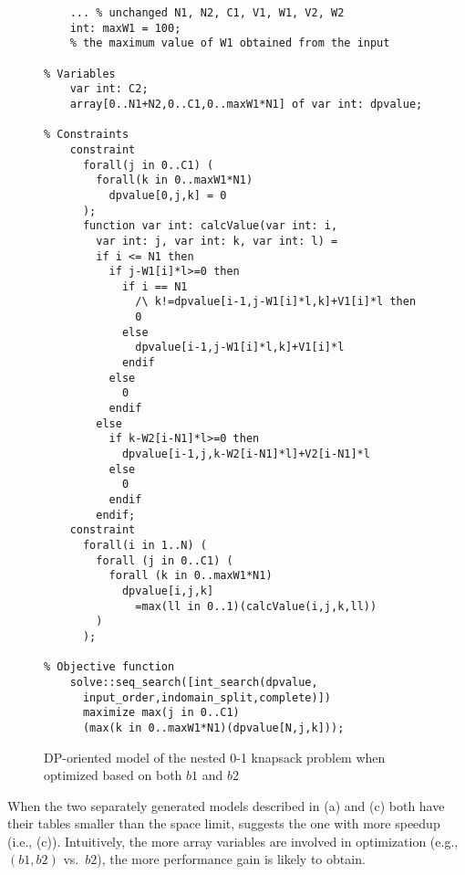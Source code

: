  	\begin{figure}[htb]
\begin{lstlisting}[frame=single]
% Input arguments
    ... % unchanged N1, N2, C1, V1, W1, V2, W2
    int: maxW1 = 100;
    % the maximum value of W1 obtained from the input

% Variables
    var int: C2;
    array[0..N1+N2,0..C1,0..maxW1*N1] of var int: dpvalue;

% Constraints
    constraint
      forall(j in 0..C1) (
        forall(k in 0..maxW1*N1)
          dpvalue[0,j,k] = 0
      );
      function var int: calcValue(var int: i, 
        var int: j, var int: k, var int: l) =
        if i <= N1 then
          if j-W1[i]*l>=0 then
            if i == N1
              /\ k!=dpvalue[i-1,j-W1[i]*l,k]+V1[i]*l then
              0
            else
              dpvalue[i-1,j-W1[i]*l,k]+V1[i]*l
            endif  
          else
            0
          endif
        else
          if k-W2[i-N1]*l>=0 then
            dpvalue[i-1,j,k-W2[i-N1]*l]+V2[i-N1]*l
          else
            0
          endif
        endif;
    constraint
      forall(i in 1..N) (
        forall (j in 0..C1) (
          forall (k in 0..maxW1*N1)
            dpvalue[i,j,k]
              =max(ll in 0..1)(calcValue(i,j,k,ll))
        )
      );

% Objective function    
    solve::seq_search([int_search(dpvalue,
      input_order,indomain_split,complete)]) 
      maximize max(j in 0..C1)
      (max(k in 0..maxW1*N1)(dpvalue[N,j,k]));
\end{lstlisting}
\caption{DP-oriented model of the nested 0-1 knapsack problem when optimized based on both $b1$ and $b2$}\label{fig:knapsack4}
\end{figure}

 When the two separately generated models described in (a) and (c) both have their tables smaller than the space limit, \tool suggests the one with more speedup (i.e., (c)). Intuitively, the more array variables are involved in optimization (e.g., $(b1, b2)$ vs.~$b2$), the more performance gain \tool is likely to obtain.  
 
